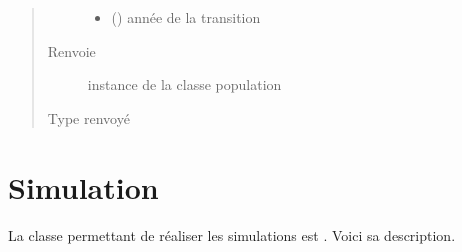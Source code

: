 \documentclass[letterpaper,10pt,french]{sphinxmanual}
\begin{document}
\begin{fulllineitems}
\begin{fulllineitems}
\begin{quote}
\begin{description}
\begin{itemize}
\item {} 
 () \textendash{} année de la transition

\end{itemize}

\item[{Renvoie}] \leavevmode
instance de la classe population

\item[{Type renvoyé}] \leavevmode
{\hyperref[\detokenize{code:simgen.population}]{}}

\end{description}\end{quote}

\end{fulllineitems}


\end{fulllineitems}



\section{Simulation}
\label{\detokenize{code:simulation}}
La classe permettant de réaliser les simulations est . Voici sa description.
\end{document}
